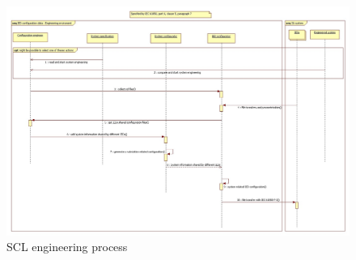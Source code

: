 \begin{landscape}
	\begin{figure}
	  \includegraphics[width=1.0\linewidth]{chapters/ch-scl/figures/SCL-development-process}
	  \caption{SCL engineering process}
	  \label{fig:SCL-development-process}
	\end{figure}
\end{landscape}

